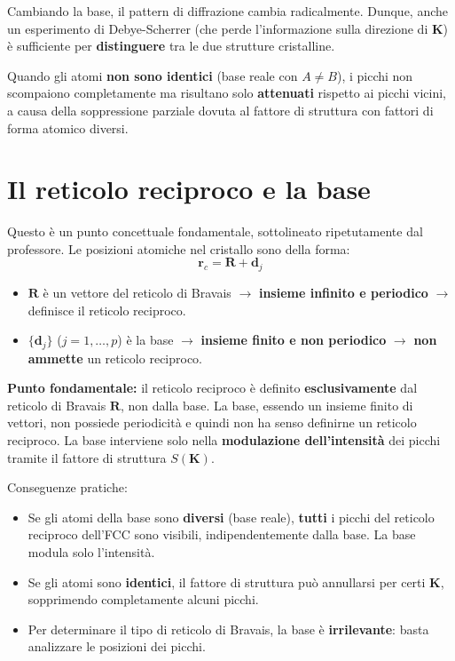 Cambiando la base, il pattern di diffrazione cambia radicalmente. Dunque, anche un esperimento di Debye-Scherrer (che perde l'informazione sulla direzione di $\mathbf{K}$) è sufficiente per \textbf{distinguere} tra le due strutture cristalline.

Quando gli atomi \textbf{non sono identici} (base reale con $A \neq B$), i picchi non scompaiono completamente ma risultano solo \textbf{attenuati} rispetto ai picchi vicini, a causa della soppressione parziale dovuta al fattore di struttura con fattori di forma atomico diversi.

\section{Il reticolo reciproco e la base}

Questo è un punto concettuale fondamentale, sottolineato ripetutamente dal professore. Le posizioni atomiche nel cristallo sono della forma:
\begin{equation}
\mathbf{r}_c = \mathbf{R} + \mathbf{d}_j
\end{equation}

\begin{itemize}
    \item $\mathbf{R}$ è un vettore del reticolo di Bravais $\to$ \textbf{insieme infinito e periodico} $\to$ definisce il reticolo reciproco.
    \item $\{\mathbf{d}_j\}$ ($j = 1, \ldots, p$) è la base $\to$ \textbf{insieme finito e non periodico} $\to$ \textbf{non ammette} un reticolo reciproco.
\end{itemize}


\textbf{Punto fondamentale:} il reticolo reciproco è definito \textbf{esclusivamente} dal reticolo di Bravais $\mathbf{R}$, non dalla base. La base, essendo un insieme finito di vettori, non possiede periodicità e quindi non ha senso definirne un reticolo reciproco. La base interviene solo nella \textbf{modulazione dell'intensità} dei picchi tramite il fattore di struttura $S(\mathbf{K})$.


Conseguenze pratiche:
\begin{itemize}
    \item Se gli atomi della base sono \textbf{diversi} (base reale), \textbf{tutti} i picchi del reticolo reciproco dell'FCC sono visibili, indipendentemente dalla base. La base modula solo l'intensità.
    \item Se gli atomi sono \textbf{identici}, il fattore di struttura può annullarsi per certi $\mathbf{K}$, sopprimendo completamente alcuni picchi.
    \item Per determinare il tipo di reticolo di Bravais, la base è \textbf{irrilevante}: basta analizzare le posizioni dei picchi.
\end{itemize}

